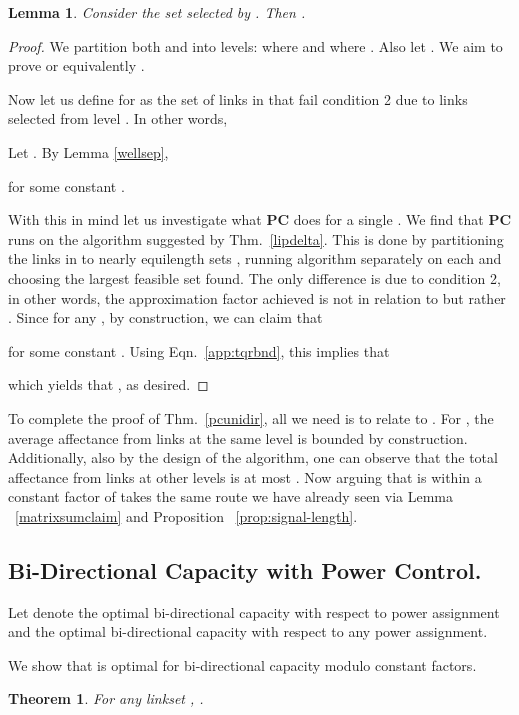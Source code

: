 \documentclass[11pt]{amsart}
\newcommand{\alg}[1]{\textbf{#1}}
\newcounter{foo}
\newtheorem{theorem}[foo]{Theorem}
\newtheorem{lemma}[foo]{Lemma}
\begin{document}
\begin{lemma}
Consider the set  selected by . Then .
\end{lemma}
\begin{proof}
We partition both  and  into levels: 
 where  and   where .  Also let . 
We aim to prove  or equivalently 
.

Now let us define  for  as the set of links in  that fail condition 2 
due to links selected from level . In other words, 


\noindent Let . By Lemma \ref{wellsep},

for some constant .

With this in mind let us investigate what \alg{PC} does for a single . We find that 
\alg{PC} runs on  the algorithm suggested by Thm.~\ref{lipdelta}. 
This is done by partitioning the links in to nearly equilength sets , running
algorithm  separately on each  and choosing the largest feasible set found.
The only difference is due to condition 2, in other words, the  approximation factor achieved is not
in relation to  but rather .
Since for any ,  by construction, we can claim that 

 for some constant .
Using Eqn.~\ref{app:tqrbnd}, this implies that

which yields that , as desired.
\iffalse
.
Plugging we get,  from which we finally get
.
\fi
\end{proof}

To complete the proof of Thm.~\ref{pcunidir}, all we need is to relate  to .
For , the average affectance from links at the same level is
bounded by construction.
Additionally, also by the design of the algorithm, one can observe that the 
total affectance from links at other levels is at most .
Now arguing that  is within a constant factor of  takes the same route
we have already seen via Lemma ~\ref{matrixsumclaim} and Proposition ~\ref{prop:signal-length}.

\subsection{Bi-Directional Capacity with Power Control.}


Let  denote the optimal bi-directional capacity with
respect to power assignment  and
 the optimal bi-directional capacity with respect to any
power assignment.

We show that  is optimal for bi-directional capacity modulo
constant factors.
\begin{theorem}
For any linkset , .
\label{thm:mean-vs-any-bidi}
\end{theorem}
\end{document}
